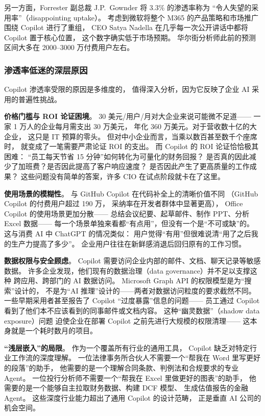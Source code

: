另一方面，Forrester 副总裁 J.P.~Gownder 将 3.3\% 的渗透率称为
``令人失望的采用率''（disappointing uptake）。
考虑到微软将整个 M365 的产品策略和市场推广围绕 Copilot 进行了重组，
CEO Satya Nadella 在几乎每一次公开讲话中都将 Copilot 置于核心位置，
这个数字确实低于市场预期。
华尔街分析师此前的预测区间大多在 2000--3000 万付费用户左右。

\subsubsection{渗透率低迷的深层原因}
Copilot 渗透率受限的原因是多维度的，
值得深入分析，因为它反映了企业 AI 采用的普遍性挑战。

\textbf{价格门槛与 ROI 论证困境}。
30 美元/用户/月对大企业来说可能微不足道——
一家 1 万人的企业每月需支出 30 万美元，
年化 360 万美元。对于营收数十亿的大企业，
这只是 IT 预算的零头。
但对中小企业而言，当乘以数百甚至数千个座席时，
就变成了一笔需要严肃论证 ROI 的支出。
而 Copilot 的 ROI 论证恰恰极其困难：
``员工每天节省 15 分钟''如何转化为可量化的财务回报？
是否真的因此减少了加班费？是否因此提高了客户响应速度？
是否因此产生了更高质量的工作成果？
这些问题没有简单的答案，许多 CIO 在试点阶段就卡在了这里。

\textbf{使用场景的模糊性}。
与 GitHub Copilot 在代码补全上的清晰价值不同
（GitHub Copilot 的付费用户超过 190 万，
采纳率在开发者群体中显著更高），
Office Copilot 的使用场景更加分散——
总结会议纪要、起草邮件、制作 PPT、分析 Excel 数据——
每一个场景单独来看都``有点用''，但没有一个是``不可或缺''的。
这与消费 AI 中 ChatGPT 的情况类似：
用户觉得``有用''但很难说清``用了之后我的生产力提高了多少''。
企业用户往往在新鲜感消退后回归原有的工作习惯。

\textbf{数据权限与安全顾虑}。
Copilot 需要访问企业内部的邮件、文档、聊天记录等敏感数据。
许多企业发现，他们现有的数据治理（data governance）并不足以支撑这种
跨应用、跨部门的 AI 数据访问。
Microsoft Graph API 的权限模型是为``搜索''设计的，
不是为``AI 推理''设计的——两者对数据访问粒度的要求截然不同。
一些早期采用者甚至报告了 Copilot ``过度暴露''信息的问题——
员工通过 Copilot 看到了他们本不应该看到的同事邮件或文档内容。
这种``幽灵数据''（shadow data exposure）问题
迫使企业在部署 Copilot 之前先进行大规模的权限清理——
这本身就是一个耗时数月的项目。

\textbf{``浅层嵌入''的局限}。
作为一个覆盖所有行业的通用工具，
Copilot 缺乏对特定行业工作流的深度理解。
一位法律事务所合伙人不需要一个``帮我在 Word 里写更好的段落''的助手，
他需要的是一个理解合同条款、判例法和合规要求的专业 Agent。
一位投行分析师不需要一个``帮我在 Excel 里做更好的图表''的助手，
他需要的是一个能够自主拉取财务数据、构建 DCF 模型、
生成估值报告的金融 Agent。
这些深度行业能力超出了通用 Copilot 的设计范畴，
正是垂直 AI 公司的机会空间。

